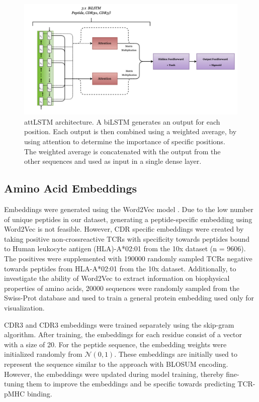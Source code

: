 \begin{figure}[H]
    \centering
    \includegraphics[width=\linewidth]{figures/attLSTM_architecture.png}
    \caption{attLSTM architecture. A biLSTM generates an output for each position. Each output is then combined using a weighted average, by using attention to determine the importance of specific positions. The weighted average is concatenated with the output from the other sequences and used as input in a single dense layer.}
    \label{fig:attLSTM_architecture}
\end{figure}

\subsection{Amino Acid Embeddings} \label{embedding}
Embeddings were generated using the Word2Vec model \cite{Mikolov2013EfficientSpace, Rehurek2011Gensim--pythonModelling}. Due to the low number of unique peptides in our dataset, generating a peptide-specific embedding using Word2Vec is not feasible. However, CDR specific embeddings were created by taking positive non-crossreactive TCRs with specificity towards peptides bound to Human leukocyte antigen (HLA)-A*02:01 from the 10x dataset (n = 9606). The positives were supplemented with 190000 randomly sampled TCRs negative towards peptides from HLA-A*02:01 from the 10x dataset. Additionally, to investigate the ability of Word2Vec to extract information on biophysical properties of amino acids, 20000 sequences were randomly sampled from the Swiss-Prot database \cite{Bateman2021UniProt:2021} and used to train a general protein embedding used only for visualization.

CDR3{\textalpha} and CDR3{\textbeta} embeddings were trained separately using the skip-gram algorithm. After training, the embeddings for each residue consist of a vector with a size of 20. For the peptide sequence, the embedding weights were initialized randomly from $\mathcal{N}(0,1)$. These embeddings are initially used to represent the sequence similar to the approach with BLOSUM encoding. However, the embeddings were updated during model training, thereby fine-tuning them to improve the embeddings and be specific towards predicting TCR-pMHC binding.

